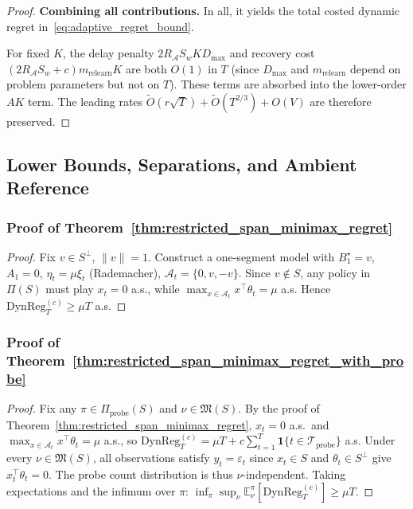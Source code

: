 \documentclass{article}
\newcommand{\E}{\mathbb{E}}
\newcommand{\cA}{\mathcal{A}}
\newcommand{\cTprobe}{\mathcal{T}_{\mathrm{probe}}}
\newcommand{\DynReg}{\mathrm{DynReg}}
\begin{document}
\begin{proof}
\textbf{Combining all contributions.}
In all, it yields the total costed dynamic regret in~\eqref{eq:adaptive_regret_bound}.

For fixed $K$, the delay penalty $2R_{\cA} S_w K D_{\max}$ and recovery cost $(2R_{\cA} S_w + c) m_{\mathrm{relearn}} K$ are both $O(1)$ in $T$ (since $D_{\max}$ and $m_{\mathrm{relearn}}$ depend on problem parameters but not on $T$).  These terms are absorbed into the lower-order $AK$ term.  The leading rates $\widetilde O(r\sqrt{T}) + \widetilde O(T^{2/3}) + O(V)$ are therefore preserved.
\end{proof}

\subsection{Lower Bounds, Separations, and Ambient Reference}

\subsubsection{Proof of Theorem~\ref{thm:restricted_span_minimax_regret}}
\label{proof:restricted_span_minimax_regret}

\begin{proof}
Fix $v \in S^\perp$, $\|v\|=1$.
Construct a one-segment model with $B_1^\star = v$, $A_1 = 0$, $\eta_t = \mu \xi_t$ (Rademacher), $\cA_t = \{0, v, -v\}$.
Since $v \notin S$, any policy in $\Pi(S)$ must play $x_t = 0$ a.s., while $\max_{x \in \cA_t} x^\top \theta_t = \mu$ a.s.
Hence $\DynReg_T^{(c)} \ge \mu T$ a.s.
\end{proof}

\subsubsection{Proof of Theorem~\ref{thm:restricted_span_minimax_regret_with_probe}}
\label{proof:restricted_span_minimax_regret_with_probe}

\begin{proof}
Fix any $\pi \in \Pi_{\mathrm{probe}}(S)$ and $\nu \in \mathfrak M(S)$.
By the proof of Theorem~\ref{thm:restricted_span_minimax_regret}, $x_t = 0$ a.s.\ and $\max_{x\in\cA_t} x^\top \theta_t = \mu$ a.s., so
$\DynReg_T^{(c)} = \mu T + c\sum_{t=1}^T \mathbf{1}\{t\in\cTprobe\}$ a.s.
Under every $\nu \in \mathfrak M(S)$, all observations satisfy $y_t = \varepsilon_t$ since $x_t \in S$ and $\theta_t \in S^\perp$ give $x_t^\top \theta_t = 0$.
The probe count distribution is thus $\nu$-independent.
Taking expectations and the infimum over $\pi$:
$\inf_{\pi} \sup_{\nu} \E_\nu^\pi[\DynReg_T^{(c)}] \ge \mu T$.
\end{proof}
\end{document}
